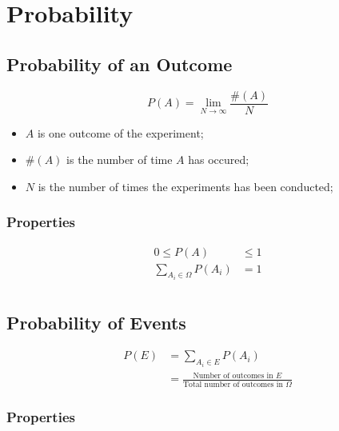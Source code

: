 \section{Probability}
  
  \subsection{Probability of an Outcome}

    \begin{equation}
      P \left( A \right) = \lim_{N \to \infty} \frac{\#\left( A \right)}{N}
    \end{equation}
    
    \begin{itemize}
      \item $ A $ is one outcome of the experiment;
      \item $ \#\left( A \right) $ is the number of time $ A $ has occured;
      \item $ N $ is the number of times the experiments has been conducted;
    \end{itemize}
    
    \subsubsection{Properties}
    
      \begin{align}
        0 \le P\left( A \right) &\le 1 \\
        \sum_{A_{i} \in \Omega} P\left( A_{i} \right) &= 1 \\
      \end{align}

  \subsection{Probability of Events}
  
    \begin{align}
      \label{eq: ch3-probability-from-outcomes}
      P\left( E \right) &= \sum_{A_{i} \in E} P\left( A_{i} \right) \\
      &= \frac{\text{Number of outcomes in } E}{\text{Total number of outcomes in } \Omega}
    \end{align}
  
    \subsubsection{Properties}
    
